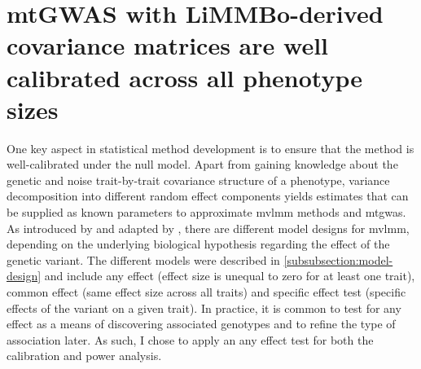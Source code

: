 \section{mtGWAS with LiMMBo-derived covariance matrices are well calibrated across all phenotype sizes}
\label{section:calibration-limmbo}
One key aspect in statistical method development is to ensure that the method is well-calibrated under the null model. Apart from gaining knowledge about the genetic and noise trait-by-trait covariance structure of a phenotype, variance decomposition into different random effect components yields estimates that can be supplied as known parameters to approximate \gls{mvlmm} methods and \gls{mtgwas}. As introduced by \citet{Jiang1995} and adapted by \citet{Korte2012}, there are different model designs for \gls{mvlmm}, depending on the underlying biological hypothesis regarding the effect of the genetic variant. The different models were described in \cref{subsubsection:model-design} and include any effect (effect size is unequal to zero for at least one trait), common effect (same effect size across all traits) and specific effect test (specific effects of the variant on a given trait). In practice, it is common to test for any effect as a means of discovering associated genotypes and to refine the type of association later. As such, I chose to apply an any effect test for both the calibration and power analysis.

